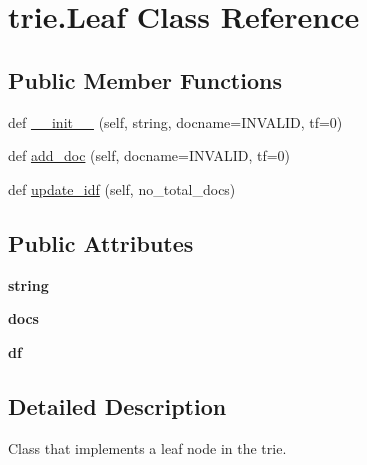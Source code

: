 \hypertarget{classtrie_1_1_leaf}{}\section{trie.\+Leaf Class Reference}
\label{classtrie_1_1_leaf}
\subsection*{Public Member Functions}
\begin{DoxyCompactItemize}
\item 
def \hyperlink{classtrie_1_1_leaf_a94532c800b40efc2149253b17ec0c4bb}{\+\_\+\+\_\+init\+\_\+\+\_\+} (self, string, docname=\textquotesingle{}I\+N\+V\+A\+L\+ID\textquotesingle{}, tf=0)
\item 
def \hyperlink{classtrie_1_1_leaf_a12744c5a7b2adc68b9c5db1d98d19043}{add\+\_\+doc} (self, docname=\textquotesingle{}I\+N\+V\+A\+L\+ID\textquotesingle{}, tf=0)
\item 
def \hyperlink{classtrie_1_1_leaf_aaa23c1a673b7551a8ad04a56dcc50bbc}{update\+\_\+idf} (self, no\+\_\+total\+\_\+docs)
\end{DoxyCompactItemize}
\subsection*{Public Attributes}
\begin{DoxyCompactItemize}
\item 
{\bfseries string}\hypertarget{classtrie_1_1_leaf_aeb8d812870e35169f236b42e2eaafb3c}{}\label{classtrie_1_1_leaf_aeb8d812870e35169f236b42e2eaafb3c}

\item 
{\bfseries docs}\hypertarget{classtrie_1_1_leaf_a9066db1d4e05860a45c113e9b611c90b}{}\label{classtrie_1_1_leaf_a9066db1d4e05860a45c113e9b611c90b}

\item 
{\bfseries df}\hypertarget{classtrie_1_1_leaf_ac6a1252426caf3b28952fc9f958b65ad}{}\label{classtrie_1_1_leaf_ac6a1252426caf3b28952fc9f958b65ad}

\end{DoxyCompactItemize}


\subsection{Detailed Description}
\begin{DoxyVerb}Class that implements a leaf node in the trie.
\end{DoxyVerb}
 

